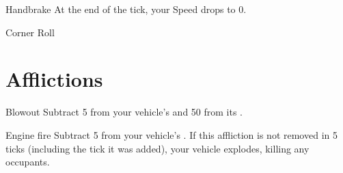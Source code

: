 \documentclass[10pt, a4paper, twocolumn]{article}
\begin{document}
\begin{describe}{Handbrake}
  At the end of the tick, your Speed drops to 0.
\end{describe}

\begin{describe}{Corner}
  Roll 
\end{describe}

\section{Afflictions}

\begin{describe}{Blowout}
  Subtract 5 from your vehicle's  and 50 from its .
\end{describe}

\begin{describe}{Engine fire}
  Subtract 5 from your vehicle's . If this affliction is not removed in 5 ticks (including the tick it was added), your vehicle explodes, killing any occupants.
\end{describe}
\end{document}
